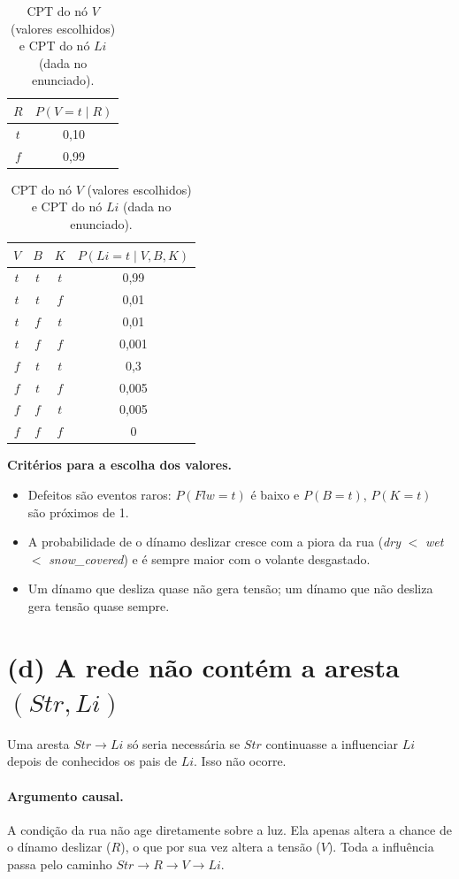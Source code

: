 \documentclass[12pt,a4paper]{article}
\newcommand{\Str}{\mathit{Str}}
\newcommand{\Flw}{\mathit{Flw}}
\newcommand{\Li}{\mathit{Li}}
\begin{document}
\begin{table}[H]
\centering
\begin{tabular}{cc}
\toprule
$R$ & $P(V = t \mid R)$ \\
\midrule
$t$ & 0,10 \\
$f$ & 0,99 \\
\bottomrule
\end{tabular}
\qquad
\begin{tabular}{cccc}
\toprule
$V$ & $B$ & $K$ & $P(\Li = t \mid V, B, K)$ \\
\midrule
$t$ & $t$ & $t$ & 0,99  \\
$t$ & $t$ & $f$ & 0,01  \\
$t$ & $f$ & $t$ & 0,01  \\
$t$ & $f$ & $f$ & 0,001 \\
$f$ & $t$ & $t$ & 0,3   \\
$f$ & $t$ & $f$ & 0,005 \\
$f$ & $f$ & $t$ & 0,005 \\
$f$ & $f$ & $f$ & 0     \\
\bottomrule
\end{tabular}
\caption{CPT do nó $V$ (valores escolhidos) e CPT do nó $\Li$ (dada no enunciado).}
\label{tab:li}
\end{table}

\noindent\textbf{Critérios para a escolha dos valores.}
\begin{itemize}
  \item Defeitos são eventos raros: $P(\Flw = t)$ é baixo e $P(B = t)$, $P(K = t)$
        são próximos de 1.
  \item A probabilidade de o dínamo deslizar cresce com a piora da rua
        (\textit{dry} $<$ \textit{wet} $<$ \textit{snow\_covered}) e é sempre maior
        com o volante desgastado.
  \item Um dínamo que desliza quase não gera tensão; um dínamo que não desliza gera
        tensão quase sempre.
\end{itemize}

\section*{(d) A rede não contém a aresta $(\Str, \Li)$}

Uma aresta $\Str \to \Li$ só seria necessária se $\Str$ continuasse a influenciar
$\Li$ depois de conhecidos os pais de $\Li$. Isso não ocorre.

\paragraph{Argumento causal.} A condição da rua não age diretamente sobre a luz. Ela
apenas altera a chance de o dínamo deslizar ($R$), o que por sua vez altera a tensão
($V$). Toda a influência passa pelo caminho $\Str \to R \to V \to \Li$.
\end{document}
